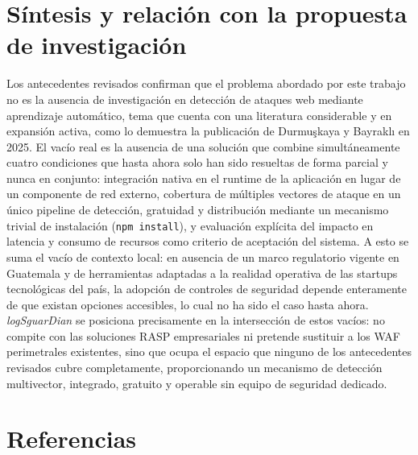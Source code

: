 \section{Síntesis y relación con la propuesta de investigación}
Los antecedentes revisados confirman que el problema abordado por este trabajo no es la ausencia
de investigación en detección de ataques web mediante aprendizaje automático, tema que cuenta
con una literatura considerable y en expansión activa, como lo demuestra la publicación de Durmuşkaya y Bayraklı \cite{durmuskaya2025waf} en 2025. El vacío real
es la ausencia de una solución que combine simultáneamente cuatro condiciones que hasta ahora
solo han sido resueltas de forma parcial y nunca en conjunto: integración nativa en el runtime de
la aplicación en lugar de un componente de red externo, cobertura de múltiples vectores de ataque
en un único pipeline de detección, gratuidad y distribución mediante un mecanismo trivial de
instalación (\texttt{npm install}), y evaluación explícita del impacto en latencia y consumo de recursos
como criterio de aceptación del sistema. A esto se suma el vacío de contexto local: en ausencia de
un marco regulatorio vigente en Guatemala \cite{lahora2026estancada} y de herramientas
adaptadas a la realidad operativa de las startups tecnológicas del país, la adopción de controles de
seguridad depende enteramente de que existan opciones accesibles, lo cual no ha sido el caso
hasta ahora. \textit{logSguarDian} se posiciona precisamente en la intersección de estos vacíos: no
compite con las soluciones RASP empresariales ni pretende sustituir a los WAF perimetrales
existentes, sino que ocupa el espacio que ninguno de los antecedentes revisados cubre
completamente, proporcionando un mecanismo de detección multivector, integrado, gratuito y
operable sin equipo de seguridad dedicado.

\ifdefined\modoensamble
\else
	\section*{Referencias}
	\printbibliography[heading=none]
	
\fi
